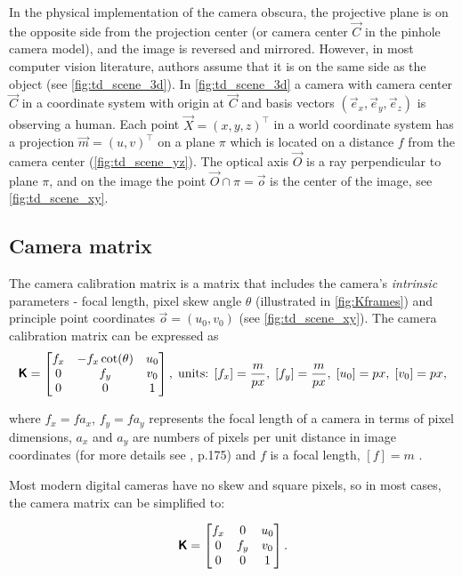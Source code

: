 In the physical implementation of the camera obscura, the projective plane is on the opposite side from the projection center (or camera center $\vec{C}$ in the pinhole camera model), and the image is reversed and mirrored. 
However, in most computer vision literature, authors assume that it is on the same side as the object (see \autoref{fig:td_scene_3d}).
In \autoref{fig:td_scene_3d} a camera with camera center $\vec{C}$ in a coordinate system with origin at $\vec{C}$ and basis vectors $(\vec{e}_x, \vec{e}_y, \vec{e}_z)$ is observing a human. 
Each point $\vec{X} = (x, y, z)^\top$ in a world coordinate system has a projection $\vec{m} = (u, v)^\top$ on a plane $\pi$ which is located on a distance $f$ from the camera center (\autoref{fig:td_scene_yz}). 
The optical axis $\vec{O}$ is a ray perpendicular to plane $\pi$, and on the image the point $ \vec{O} \cap \pi = \vec{o}$ is the center of the image, see \autoref{fig:td_scene_xy}.

\subsection{Camera matrix}
The camera calibration matrix is a matrix that includes the camera's \textit{intrinsic} parameters - focal length, pixel skew angle $\theta$ (illustrated in \autoref{fig:Kframes}) and principle point coordinates $\vec{o} = (u_0, v_0)$ (see \autoref{fig:td_scene_xy}).
The camera calibration matrix can be expressed as
\begin{equation}
    \pmb{\mathsf{K}} = \begin{bmatrix}
        f_x & -f_x \cot(\theta) & u_0 \\
        0 & f_y & v_0 \\
        0 & 0 & 1 \\
    \end{bmatrix},
    \textrm{\;units: } [f_x]=\frac{m}{px},\; [f_y]=\frac{m}{px},\; [u_0]=px,\; [v_0]=px,
\end{equation}

where $f_x = f a_x$, $f_y = f a_y$ represents the focal length of a camera in terms of pixel dimensions, $a_x$ and $a_y$ are numbers of pixels per unit distance in image coordinates (for more details see \cite{hartley_zisserman_2004}, p.175) and $f$ is a focal length, $[f] = m$ .

Most modern digital cameras have no skew and square pixels, so in most cases, the camera matrix can be simplified to:

\begin{equation}
    \label{eq:kmat}
    \pmb{\mathsf{K}} = \begin{bmatrix}
        f_x & 0 & u_0 \\
        0 & f_y & v_0 \\
        0 & 0 & 1 \\
    \end{bmatrix}.
\end{equation}

